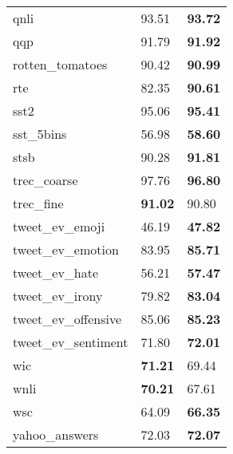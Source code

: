 \documentclass[11pt]{article}
\begin{document}
\begin{table}[H]
\begin{tabular}{@{}lll@{}}
qnli                   & 93.51           & \textbf{93.72}             \\
qqp                    & 91.79           & \textbf{91.92}             \\
rotten\_tomatoes       & 90.42           & \textbf{90.99}             \\
rte                    & 82.35           & \textbf{90.61}             \\
sst2                   & 95.06           & \textbf{95.41}             \\
sst\_5bins             & 56.98           & \textbf{58.60}             \\
stsb                   & 90.28           & \textbf{91.81}             \\
trec\_coarse           & 97.76           & \textbf{96.80}             \\
trec\_fine             & \textbf{91.02}  & 90.80                      \\
tweet\_ev\_emoji       & 46.19           & \textbf{47.82}             \\
tweet\_ev\_emotion     & 83.95           & \textbf{85.71}             \\
tweet\_ev\_hate        & 56.21           & \textbf{57.47}             \\
tweet\_ev\_irony       & 79.82           & \textbf{83.04}             \\
tweet\_ev\_offensive   & 85.06           & \textbf{85.23}             \\
tweet\_ev\_sentiment   & 71.80           & \textbf{72.01}             \\
wic                    & \textbf{71.21}  & 69.44                      \\
wnli                   & \textbf{70.21}  & 67.61                      \\
wsc                    & 64.09           & \textbf{66.35}             \\
yahoo\_answers         & 72.03           & \textbf{72.07}             \\ \bottomrule
\end{tabular}
\end{table}
\end{document}
